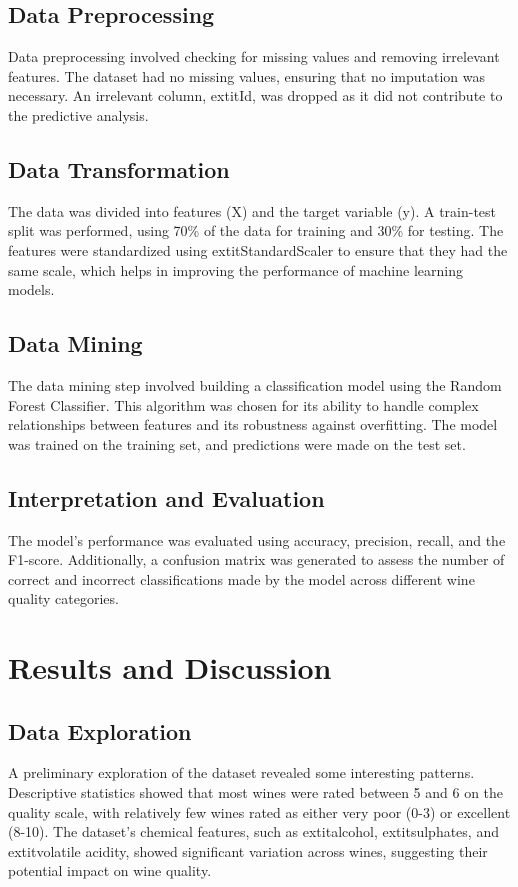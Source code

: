 \documentclass{article}
\begin{document}
\subsection{Data Preprocessing}
Data preprocessing involved checking for missing values and removing irrelevant features. The dataset had no missing values, ensuring that no imputation was necessary. An irrelevant column, 	extit{Id}, was dropped as it did not contribute to the predictive analysis.

\subsection{Data Transformation}
The data was divided into features (X) and the target variable (y). A train-test split was performed, using 70\% of the data for training and 30\% for testing. The features were standardized using 	extit{StandardScaler} to ensure that they had the same scale, which helps in improving the performance of machine learning models.

\subsection{Data Mining}
The data mining step involved building a classification model using the Random Forest Classifier. This algorithm was chosen for its ability to handle complex relationships between features and its robustness against overfitting. The model was trained on the training set, and predictions were made on the test set.

\subsection{Interpretation and Evaluation}
The model's performance was evaluated using accuracy, precision, recall, and the F1-score. Additionally, a confusion matrix was generated to assess the number of correct and incorrect classifications made by the model across different wine quality categories.

\section{Results and Discussion}

\subsection{Data Exploration}
A preliminary exploration of the dataset revealed some interesting patterns. Descriptive statistics showed that most wines were rated between 5 and 6 on the quality scale, with relatively few wines rated as either very poor (0-3) or excellent (8-10). The dataset’s chemical features, such as 	extit{alcohol}, 	extit{sulphates}, and 	extit{volatile acidity}, showed significant variation across wines, suggesting their potential impact on wine quality.
\end{document}
